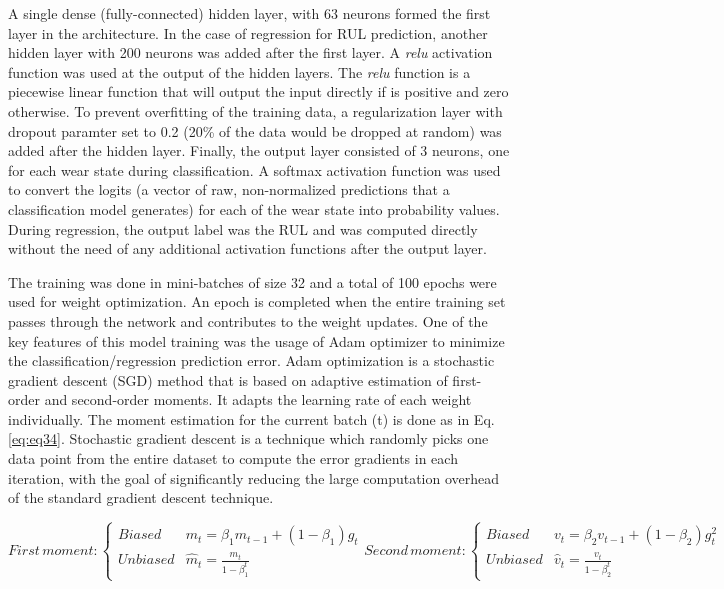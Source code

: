 \documentclass[preprint,review,12pt]{elsarticle}
\begin{document}
A single dense (fully-connected) hidden layer, with $63$ neurons formed the first layer in the architecture. In the case of regression for RUL prediction, another hidden layer with 200 neurons was added after the first layer. A \emph{relu} activation function was used at the output of the hidden layers. The \emph{relu} function is a piecewise linear function that will output the input directly if is positive and zero otherwise. To prevent overfitting of the training data, a regularization layer with dropout paramter set to 0.2 (20\% of the data would be dropped at random) was added after the hidden layer. Finally, the output layer consisted of 3 neurons, one for each wear state during classification. A softmax activation function was used to convert the logits (a vector of raw, non-normalized predictions that a classification model generates) for each of the wear state into probability values. During regression, the output label was the RUL and was computed directly without the need of any additional activation functions after the output layer. \par

The training was done in mini-batches of size 32 and a total of 100 epochs were used for weight optimization. An epoch is completed when the entire training set passes through the network and contributes to the weight updates. One of the key features of this model training was the usage of Adam optimizer to minimize the classification/regression prediction error. Adam optimization is a stochastic gradient descent (SGD) method that is based on adaptive estimation of first-order and second-order moments. It adapts the learning rate of each weight individually. The moment estimation for the current batch (t) is done as in Eq. \ref{eq:eq34}. Stochastic gradient descent is a technique which randomly picks one data point from the entire dataset to compute the error gradients in each iteration, with the goal of significantly reducing the large computation overhead of the standard gradient descent technique. \par

\begin{subequations}\label{eq:eq34}
  \begin{equation}
    First\,moment:
    \begin{cases}
      Biased & m_t = \beta_1m_{t-1} + (1-\beta_1)g_t \\
      Unbiased & \hat m_t = \frac{m_t}{1-\beta_1^t}
    \end{cases}
  \end{equation}
  \begin{equation}
    Second\,moment:
    \begin{cases}
      Biased & v_t = \beta_2v_{t-1} + (1-\beta_2)g_t^2 \\
      Unbiased & \hat v_t = \frac{v_t}{1-\beta_2^t}
    \end{cases}
  \end{equation}
\end{subequations}
\end{document}
